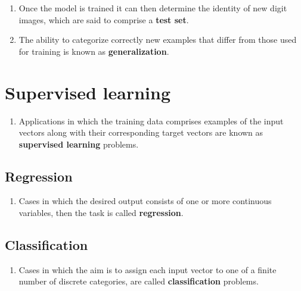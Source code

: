 \begin{enumerate}
    \item Once the model is trained it can then determine the identity of new digit images, which are said to comprise a \textbf{test set}. 
    \hfill \cite{ml/book/Pattern-Recognition-And-Machine-Learning/Christopher-M-Bishop}

    \item The ability to categorize correctly new examples that differ from those used for training is known as \textbf{generalization}. 
    \hfill \cite{ml/book/Pattern-Recognition-And-Machine-Learning/Christopher-M-Bishop}
\end{enumerate}





\section{Supervised learning}

\begin{enumerate}
    \item Applications in which the training data comprises examples of the input vectors along with their corresponding target vectors are known as \textbf{supervised learning} problems. 
    \hfill \cite{ml/book/Pattern-Recognition-And-Machine-Learning/Christopher-M-Bishop}
\end{enumerate}



\subsection{Regression}

\begin{enumerate}
    \item Cases in which the desired output consists of one or more continuous variables, then the task is called \textbf{regression}. 
    \hfill \cite{ml/book/Pattern-Recognition-And-Machine-Learning/Christopher-M-Bishop}
\end{enumerate}


\subsection{Classification}

\begin{enumerate}
    \item Cases in which the aim is to assign each input vector to one of a finite number of discrete categories, are called \textbf{classification} problems.
    \hfill \cite{ml/book/Pattern-Recognition-And-Machine-Learning/Christopher-M-Bishop}
\end{enumerate}





